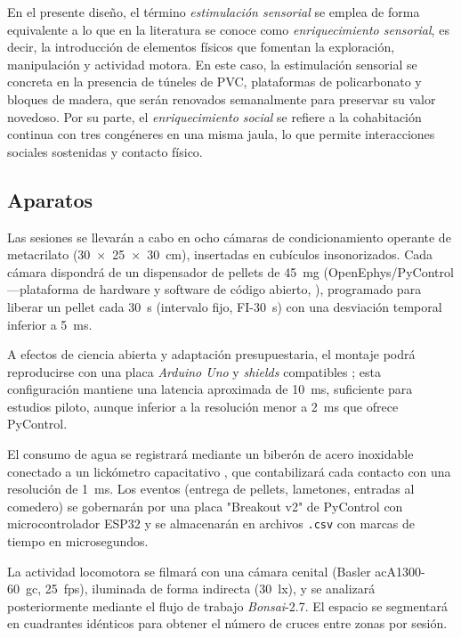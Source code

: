 \documentclass[12pt,a4paper]{article}
\begin{document}
\begin{multicols}{2}
En el presente diseño, el término \textit{estimulación sensorial} se emplea de forma equivalente a lo que en la literatura se conoce como \textit{enriquecimiento sensorial}, es decir, la introducción de elementos físicos que fomentan la exploración, manipulación y actividad motora. En este caso, la estimulación sensorial se concreta en la presencia de túneles de PVC, plataformas de policarbonato y bloques de madera, que serán renovados semanalmente para preservar su valor novedoso. Por su parte, el \textit{enriquecimiento social} se refiere a la cohabitación continua con tres congéneres en una misma jaula, lo que permite interacciones sociales sostenidas y contacto físico.

\subsection*{Aparatos}

Las sesiones se llevarán a cabo en ocho cámaras de condicionamiento operante de metacrilato (30~×~25~×~30~cm), insertadas en cubículos insonorizados. Cada cámara dispondrá de un dispensador de pellets de 45~mg (OpenEphys/PyControl —plataforma de hardware y software de código abierto, \citep{PelletDispenserGitHub}), programado para liberar un pellet cada 30~s (intervalo fijo, FI-30~s) con una desviación temporal inferior a 5~ms.

A efectos de ciencia abierta y adaptación presupuestaria, el montaje podrá reproducirse con una placa \textit{Arduino Uno} y \textit{shields} compatibles \citep{Arduino2024}; esta configuración mantiene una latencia aproximada de 10~ms, suficiente para estudios piloto, aunque inferior a la resolución menor a 2~ms que ofrece PyControl.

El consumo de agua se registrará mediante un biberón de acero inoxidable conectado a un lickómetro capacitativo \citep{pycontrol_lickometer}, que contabilizará cada contacto con una resolución de 1~ms. Los eventos (entrega de pellets, lametones, entradas al comedero) se gobernarán por una placa "Breakout v2" de PyControl con microcontrolador ESP32 y se almacenarán en archivos \texttt{.csv} con marcas de tiempo en microsegundos.

La actividad locomotora se filmará con una cámara cenital (Basler acA1300-60~gc, 25~fps), iluminada de forma indirecta (30~lx), y se analizará posteriormente mediante el flujo de trabajo \textit{Bonsai}-2.7. El espacio se segmentará en cuadrantes idénticos para obtener el número de cruces entre zonas por sesión.


\end{multicols}
\end{document}
